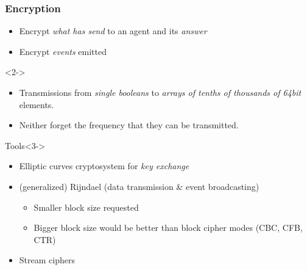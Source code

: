 \documentclass{beamer}
\begin{document}
\begin{frame}
\frametitle{Encryption}
    \begin{itemize}
        \item Encrypt \emph{what has send} to an agent and its \emph{answer}
        \item Encrypt \emph{events} emitted
    \end{itemize}
    \begin{exampleblock}{}<2->
        \begin{itemize}
            \item Transmissions from \emph{single booleans} to \emph{arrays of tenths of thousands of 64bit} elements.
            \item Neither forget the frequency that they can be transmitted.
        \end{itemize}
    \end{exampleblock}
    \begin{alertblock}{Tools}<3->
        \begin{itemize}
            \item Elliptic curves cryptosystem for \emph{key exchange}
            \item<4-> (generalized) Rijndael (data transmission \& event broadcasting)
            \begin{itemize}
                \item<5-> Smaller block size requested
                \item<5-> Bigger block size would be better than block cipher modes (CBC, CFB, CTR)
            \end{itemize}
            \item<6-> Stream ciphers
        \end{itemize}
    \end{alertblock}
\end{frame}
\end{document}
